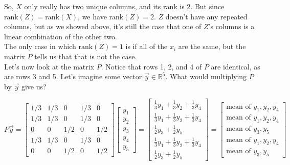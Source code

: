 \documentclass[11pt]{article}
\begin{document}
\begin{prob}
\begin{subprob}
\begin{solution}
So, $X$ only really has two unique columns, and its rank is 2. But since $\text{rank}(Z) = \text{rank}(X)$, we have $\text{rank}(Z) = 2$. $Z$ doesn't have any repeated columns, but as we showed above, it's still the case that one of $Z$'s columns is a linear combination of the other two. \\

The only case in which $\text{rank}(Z) = 1$ is if all of the $x_i$ are the same, but the matrix $P$ tells us that that is not the case. \\

Let's now look at the matrix $P$. Notice that rows 1, 2, and 4 of $P$ are identical, as are rows 3 and 5. Let's imagine some vector $\vec y \in \mathbb{R}^5$. What would multiplying $P$ by $\vec y$ give us?

$$P \vec y = \begin{bmatrix} 1/3 & 1/3 & 0      & 1/3 & 0      \\
1/3 & 1/3 & 0      & 1/3 & 0      \\
0      & 0      & 1/2    & 0      & 1/2    \\
1/3 & 1/3 & 0      & 1/3 & 0      \\
0      & 0      & 1/2    & 0      & 1/2
\end{bmatrix} \begin{bmatrix} y_1 \\ y_2 \\ y_3 \\ y_4 \\ y_5 \end{bmatrix} = \begin{bmatrix} \frac{1}{3}y_1 + \frac{1}{3}y_2 + \frac{1}{3}y_4 \\ \frac{1}{3}y_1 + \frac{1}{3}y_2 + \frac{1}{3}y_4 \\ \frac{1}{2}y_3 + \frac{1}{2}y_5 \\ \frac{1}{3}y_1 + \frac{1}{3}y_2 + \frac{1}{3}y_4 \\ \frac{1}{2}y_3 + \frac{1}{2}y_5 \end{bmatrix} = \begin{bmatrix} \text{mean of } y_1, y_2, y_4 \\ \text{mean of } y_1, y_2, y_4 \\ \text{mean of } y_3, y_5 \\ \text{mean of } y_1, y_2, y_4 \\ \text{mean of } y_3, y_5 \end{bmatrix}$$


\end{solution}
\end{subprob}
\end{prob}
\end{document}
